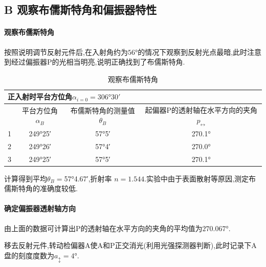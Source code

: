 \documentclass[UTF8,a4paper]{article}%
\begin{document}
\subsection*{B 观察布儒斯特角和偏振器特性}
\paragraph{观察布儒斯特角}
按照说明调节反射元件后,在入射角约为$\ang{56}$的情况下观察到反射光点最暗,此时注意到经过偏振器P的光相当明亮,说明正确找到了布儒斯特角.
\begin{table}[H]
    \caption{观察布儒斯特角}
    \centering
    \begin{tabular}{cccc}
        \hline
        \multicolumn{4}{l}{正入射时平台方位角$\alpha_{i=0}=\ang{306;30}$}                          \\ \hline
          & 平台方位角$\alpha_B$ & 布儒斯特角的测量值$\theta_B$ & 起偏器P的透射轴在水平方向的夹角$p_{\leftrightarrow}$ \\ \hline
        1 & \ang{249;25}    & \ang{57;5}          & \ang{270.1}                           \\
        2 & \ang{249;26}    & \ang{57;4}          & \ang{270.0}                           \\
        3 & \ang{249;25}    & \ang{57;5}          & \ang{270.1}                           \\ \hline
    \end{tabular}
\end{table}
计算得到平均$\theta_B=$\ang{57;4.67},折射率 $n=1.544$.实验中由于表面散射等原因,测定布儒斯特角的准确度较低.
\paragraph{确定偏振器透射轴方向}
由上面的数据可计算出P的透射轴在水平方向的夹角的平均值为$\ang{270.067}$.

移去反射元件,转动检偏器A使A和P正交消光(利用光强探测器判断),此时记录下A盘的刻度度数为$a_\updownarrow=\ang{4}$.
\end{document}
